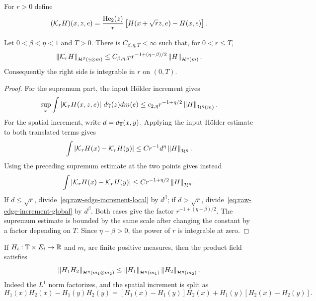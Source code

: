For $r>0$ define
\begin{equation*}
  (\mathcal K_rH)(x,z,e)
  =
  \frac{\operatorname{He}_2(z)}r
  \left[H(x+\sqrt r z,e)-H(x,e)\right].
\end{equation*}

\begin{lemma}
\label{lem:raw-one-edge-loss}
Let $0<\beta<\eta<1$ and $T>0$. There is $C_{\beta,\eta,T}<\infty$ such that, for $0<r\leq T$,
\begin{equation}
  \left\lVert\mathcal K_rH\right\rVert_{\mathcal H^\beta(\gamma\otimes m)}
  \leq
  C_{\beta,\eta,T}
  r^{-1+(\eta-\beta)/2}
  \left\lVert H\right\rVert_{\mathcal H^\eta(m)}.
  \label{eq:raw-one-edge-loss}
\end{equation}
Consequently the right side is integrable in $r$ on $(0,T)$.
\end{lemma}

\begin{proof}
For the supremum part, the input H\"older increment gives
\begin{equation*}
  \sup_x\int\left|\mathcal K_rH(x,z,e)\right|
  \,d\gamma(z)dm(e)
  \leq
  c_{2,\eta}r^{-1+\eta/2}
  \left\lVert H\right\rVert_{\mathcal H^\eta(m)}.
\end{equation*}
For the spatial increment, write $d=d_\mathbb T(x,y)$. Applying the input H\"older estimate to both translated terms gives
\begin{equation}
  \int
  \left|\mathcal K_rH(x)-\mathcal K_rH(y)\right|
  \leq
  C r^{-1}d^\eta\left\lVert H\right\rVert_{\mathcal H^\eta}.
  \label{eq:raw-edge-increment-local}
\end{equation}
Using the preceding supremum estimate at the two points gives instead
\begin{equation}
  \int
  \left|\mathcal K_rH(x)-\mathcal K_rH(y)\right|
  \leq
  C r^{-1+\eta/2}\left\lVert H\right\rVert_{\mathcal H^\eta}.
  \label{eq:raw-edge-increment-global}
\end{equation}
If $d\leq\sqrt r$, divide~\eqref{eq:raw-edge-increment-local} by $d^\beta$; if $d>\sqrt r$, divide~\eqref{eq:raw-edge-increment-global} by $d^\beta$. Both cases give the factor $r^{-1+(\eta-\beta)/2}$. The supremum estimate is bounded by the same scale after changing the constant by a factor depending on $T$. Since $\eta-\beta>0$, the power of $r$ is integrable at zero.
\end{proof}

If $H_i:\mathbb T\times E_i\to\mathbb R$ and $m_i$ are finite positive measures, then the product field satisfies
\begin{equation}
  \left\lVert H_1H_2\right\rVert_{\mathcal H^\eta(m_1\otimes m_2)}
  \leq
  \left\lVert H_1\right\rVert_{\mathcal H^\eta(m_1)}
  \left\lVert H_2\right\rVert_{\mathcal H^\eta(m_2)}.
  \label{eq:raw-product-holder}
\end{equation}
Indeed the $L^1$ norm factorizes, and the spatial increment is split as
\begin{equation*}
  H_1(x)H_2(x)-H_1(y)H_2(y)
  =
  [H_1(x)-H_1(y)]H_2(x)
  +H_1(y)[H_2(x)-H_2(y)].
\end{equation*}

